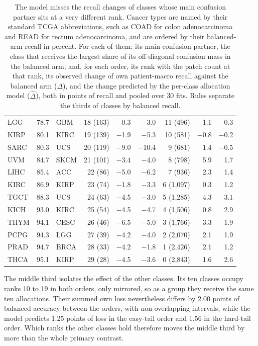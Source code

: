 \begin{table}[htbp]
\begin{tabular}{@{}lrlrrrrrr@{}}
LGG & 78.7 & GBM & 18 (163) & 0.3 & $-$3.0 & 11 (496) & 1.1 & 0.3 \\
KIRP & 80.1 & KIRC & 19 (139) & $-$1.9 & $-$5.3 & 10 (581) & $-$0.8 & $-$0.2 \\
\addlinespace
SARC & 80.3 & UCS & 20 (119) & $-$9.0 & $-$10.4 & 9 (681) & 1.4 & $-$0.5 \\
UVM & 84.7 & SKCM & 21 (101) & $-$3.4 & $-$4.0 & 8 (798) & 5.9 & 1.7 \\
LIHC & 85.4 & ACC & 22 (86) & $-$5.0 & $-$6.2 & 7 (936) & 2.3 & 1.4 \\
KIRC & 86.9 & KIRP & 23 (74) & $-$1.8 & $-$3.3 & 6 (1,097) & 0.3 & 1.2 \\
TGCT & 88.3 & UCS & 24 (63) & $-$4.5 & $-$3.0 & 5 (1,285) & 4.3 & 3.1 \\
KICH & 93.0 & KIRC & 25 (54) & $-$4.5 & $-$4.7 & 4 (1,506) & 0.8 & 2.9 \\
THYM & 94.1 & CESC & 26 (46) & $-$6.5 & $-$5.0 & 3 (1,766) & 3.3 & 1.9 \\
PCPG & 94.3 & LGG & 27 (39) & $-$4.2 & $-$4.0 & 2 (2,070) & 2.1 & 1.9 \\
PRAD & 94.7 & BRCA & 28 (33) & $-$4.2 & $-$1.8 & 1 (2,426) & 2.1 & 1.2 \\
THCA & 95.1 & KIRP & 29 (28) & $-$4.5 & $-$3.6 & 0 (2,843) & 1.6 & 2.6 \\
\bottomrule
\end{tabular}
\caption{The model misses the recall changes of classes whose main confusion partner sits at a very different rank. Cancer types are named by their standard TCGA abbreviations, such as COAD for colon adenocarcinoma and READ for rectum adenocarcinoma, and are ordered by their balanced-arm recall in percent. For each of them: its main confusion partner, the class that receives the largest share of its off-diagonal confusion mass in the balanced arm; and, for each order, its rank with the patch count at that rank, its observed change of own patient-macro recall against the balanced arm ($\Delta$), and the change predicted by the per-class allocation model ($\hat\Delta$), both in points of recall and pooled over 30 fits. Rules separate the thirds of classes by balanced recall.}
\label{tab:perclass}
\end{table}

\noindent The middle third isolates the effect of the other classes. Its ten classes occupy ranks 10 to 19 in both orders, only mirrored, so as a group they receive the same ten allocations. Their summed own loss nevertheless differs by 2.00 points of balanced accuracy between the orders, with non-overlapping intervals, while the model predicts 1.25 points of loss in the easy-tail order and 1.56 in the hard-tail order. Which ranks the other classes hold therefore moves the middle third by more than the whole primary contrast.

